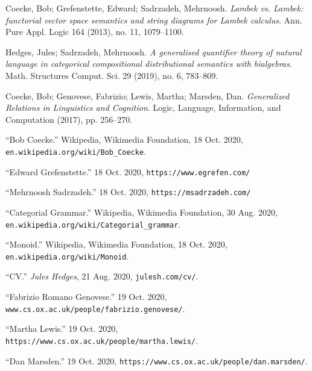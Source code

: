 \documentclass[11pt, reqno]{amsart}
\theoremstyle{plain}
\theoremstyle{definition}
\theoremstyle{example}
\begin{document}
\begin{thebibliography}{9}
Coecke, Bob;  Grefenstette, Edward; Sadrzadeh, Mehrnoosh. \textit{Lambek vs. Lambek: functorial vector space semantics and string diagrams for Lambek calculus}. Ann. Pure Appl. Logic  164  (2013),  no. 11, 1079--1100.

Hedges, Jules; Sadrzadeh, Mehrnoosh. \textit{A generalised quantifier theory of natural language in categorical compositional distributional semantics with bialgebras}. Math. Structures Comput. Sci.  29  (2019),  no. 6, 783--809.

Coecke, Bob; Genovese, Fabrizio; Lewis, Martha; Marsden, Dan. \textit{Generalized Relations in Linguistics and Cognition}. Logic, Language, Information, and Computation (2017), pp. 256--270.

“Bob Coecke.” Wikipedia, Wikimedia Foundation, 18 Oct. 2020, \texttt{en.wikipedia.org/wiki/Bob\_Coecke}.

“Edward Grefenstette.” 18 Oct. 2020, \texttt{https://www.egrefen.com/}

“Mehrnoosh Sadrzadeh.” 18 Oct. 2020, \texttt{https://msadrzadeh.com/}

“Categorial Grammar.” Wikipedia, Wikimedia Foundation, 30 Aug. 2020, \\\texttt{en.wikipedia.org/wiki/Categorial\_grammar}. 

“Monoid.” Wikipedia, Wikimedia Foundation, 18 Oct. 2020, \texttt{en.wikipedia.org/wiki/Monoid}. 

“CV.” \textit{Jules Hedges}, 21 Aug. 2020, \texttt{julesh.com/cv/}. 

“Fabrizio Romano Genovese.” 19 Oct. 2020, \texttt{www.cs.ox.ac.uk/people/fabrizio.genovese/}. 

“Martha Lewis.” 19 Oct. 2020, \texttt{https://www.cs.ox.ac.uk/people/martha.lewis/}. 

“Dan Marsden.” 19 Oct. 2020, \texttt{https://www.cs.ox.ac.uk/people/dan.marsden/}. 
\end{thebibliography}
\end{document}
